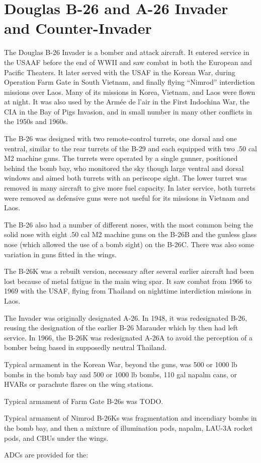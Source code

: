 \section{Douglas B-26 and A-26 Invader and Counter-Invader}

The Douglas B-26 Invader is a bomber and attack aircraft. It entered service in the USAAF before the end of WWII and saw combat in both the European and  Pacific Theaters. It later served with the USAF in the Korean War, during Operation Farm Gate in South Vietnam, and finally flying “Nimrod” interdiction missions over Laos. Many of its missions in Korea, Vietnam, and Laos were flown at night. It was also used by the Armée de l'air in the First Indochina War, the CIA in the Bay of Pigs Invasion, and in small number in many other conflicts in the 1950s and 1960s.

The B-26 was designed with two remote-control turrets, one dorsal and one ventral, similar to the rear turrets of the B-29 and each equipped with two .50 cal M2 machine guns. The turrets were operated by a single gunner, positioned behind the bomb bay, who monitored the sky though large ventral and dorsal windows and aimed both turrets with an periscope sight. The lower turret was removed in many aircraft to give more fuel capacity. In later service, both turrets were removed as defensive guns were not useful for its missions in Vietnam and Laos. 

The B-26 also had a number of different noses, with the most common being the solid nose with eight .50 cal M2 machine guns on the B-26B and the gunless glass nose (which allowed the use of a bomb sight) on the B-26C. There was also some variation in guns fitted in the wings.

The B-26K was a rebuilt version, necessary after several earlier aircraft had been lost because of metal fatigue in the main wing spar. It saw combat from 1966 to 1969 with the USAF, flying from Thailand on nighttime interdiction missions in Laos. 

The Invader was originally designated A-26. In 1948, it was redesignated B-26, reusing the designation of the earlier B-26 Marauder which by then had left service. In 1966, the B-26K was redesignated A-26A to avoid the perception of a bomber being based in supposedly neutral Thailand.

Typical armament in the Korean War, beyond the guns, was 500 or 1000 lb bombs in the bomb bay and 500 or 1000 lb bombs, 110 gal napalm cans, or HVARs or parachute flares on the wing stations.

Typical armament of Farm Gate B-26s was TODO.

Typical armament of Nimrod B-26Ks was fragmentation and incendiary bombs in the bomb bay, and then a mixture of illumination pods, napalm, LAU-3A rocket pods, and CBUs under the wings.

ADCs are provided for the:
\begin{adclist}
\end{adclist}
